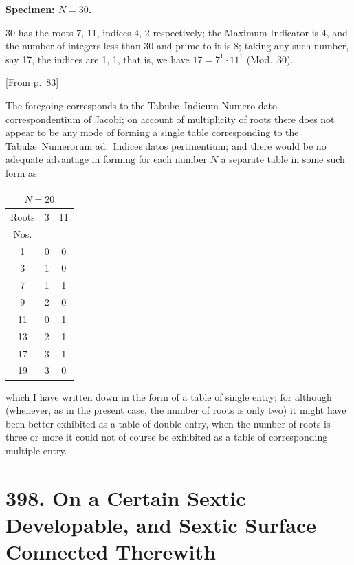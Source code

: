 \documentclass[11pt,a4paper]{article}
\theoremstyle{definition}
\begin{document}
\bigskip

\noindent\textbf{Specimen: $N = 30$.}

30 has the roots 7, 11, indices 4, 2 respectively; the Maximum Indicator is 4, and the number of integers less than 30 and prime to it is 8; taking any such number, say 17, the indices are 1, 1, that is, we have $17 = 7^1 \cdot 11^1$ (Mod.\ 30).

\bigskip

[From p.~83]

The foregoing corresponds to the Tabul\ae\ Indicum Numero dato correspondentium of Jacobi; on account of multiplicity of roots there does not appear to be any mode of forming a single table corresponding to the Tabul\ae\ Numerorum ad.\ Indices datos pertinentium; and there would be no adequate advantage in forming for each number $N$ a separate table in some such form as

\begin{center}
\begin{tabular}{c|cc}
\multicolumn{3}{c}{$N = 20$}\\
\hline
Roots & 3 & 11\\
\hline
Nos. & &\\
1 & 0 & 0\\
3 & 1 & 0\\
7 & 1 & 1\\
9 & 2 & 0\\
11 & 0 & 1\\
13 & 2 & 1\\
17 & 3 & 1\\
19 & 3 & 0\\
\end{tabular}
\end{center}

which I have written down in the form of a table of single entry; for although (whenever, as in the present case, the number of roots is only two) it might have been better exhibited as a table of double entry, when the number of roots is three or more it could not of course be exhibited as a table of corresponding multiple entry.

\newpage


\section*{398. On a Certain Sextic Developable, and Sextic Surface Connected Therewith}
\end{document}
